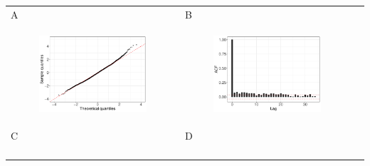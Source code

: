 \documentclass[11pt]{article}
\begin{document}
\begin{suppfigure}[ht]
	\begin{tabular}{lll}
	A&B\\
	\begin{subfigure}[t]{0.49\linewidth}
		\centering
		\includegraphics[width=1\linewidth]{figs/supp-figure-7a.pdf} 
	\end{subfigure}&
	\begin{subfigure}[t]{0.49\linewidth}
		\centering
		\includegraphics[width=1\linewidth]{figs/supp-figure-7b.pdf}
	\end{subfigure}&\\
	C&D\\
	\begin{subfigure}[t]{0.49\linewidth}
		\centering

\end{subfigure}
\end{tabular}
\end{suppfigure}
\end{document}
